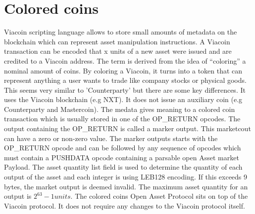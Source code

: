 \documentclass{article}
\begin{document}
\section{Colored coins}\label{Colored coins}
Viacoin scripting language allows to store small amounts of metadata on the
blockchain which can represent asset manipulation instructions. A Viacoin
transaction can be encoded that x units of a new asset were issued and are
credited to a Viacoin address. The term is derived from the idea of “coloring” a
nominal amount of coins.
By coloring a Viacoin, it turns into a token that can represent anything a user
wants to trade like company stocks or physical goods. This seems very similar to
'Counterparty' but there are some key differences. It uses the Viacoin blockchain
(e.g NXT).
\newline \newline \noindent
It does not issue an auxiliary coin (e.g Counterparty and Mastercoin).
The medata gives meaning to a \cite{coloredCoins}colored coin transaction which is usually stored
in one of the OP\_RETURN opcodes. The output containing the OP\_RETURN is called
a marker output. This marketcout can have a zero or non-zero value. The marker
outputs starts with the OP\_RETURN opcode and can be followed by any sequence
of opcodes which must contain a PUSHDATA opcode containing a parsable open
Asset market Payload.
The asset quantity list field is used to determine the quantity of each output of
the asset and each integer is using LEB128 encoding. If this exceeds 9 bytes, the
market output is deemed invalid. The maximum asset quantity for an output is
$2^63 - 1 units$.
The colored coins \cite{openAsset}Open Asset Protocol sits on top of the Viacoin protocol. It does
not require any changes to the Viacoin protocol itself.
\end{document}
